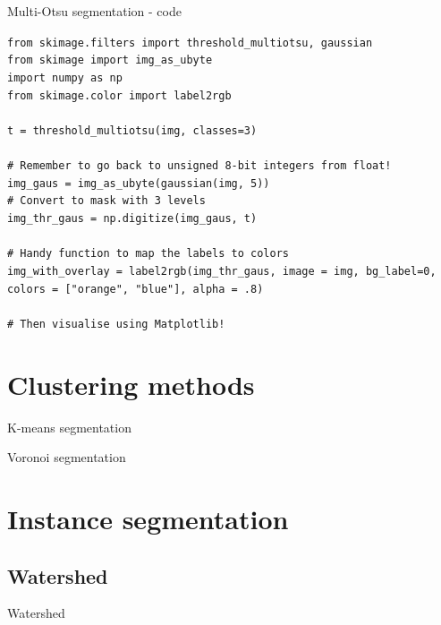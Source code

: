 \documentclass[9pt, aspectratio=169]{beamer}
\begin{document}
\begin{frame}
{Multi-Otsu segmentation - code}
\begin{codebox}
\texttt{from skimage.filters import threshold\_multiotsu, gaussian\\
from skimage import img\_as\_ubyte\\
import numpy as np\\
from skimage.color import label2rgb\\
\\
t = threshold\_multiotsu(img, classes=3)\\
\\
\# Remember to go back to unsigned 8-bit integers from float!\\
img\_gaus = img\_as\_ubyte(gaussian(img, 5))\\
\# Convert to mask with 3 levels\\
img\_thr\_gaus = np.digitize(img\_gaus, t)\\
\\
\# Handy function to map the labels to colors\\
img\_with\_overlay = label2rgb(img\_thr\_gaus, image = img, bg\_label=0, colors = ["orange", "blue"], alpha = .8)\\
\\
\# Then visualise using Matplotlib!
\\
}
\end{codebox}
\end{frame}

\section{Clustering methods}

\begin{frame}
{K-means segmentation}
\end{frame}

\begin{frame}
{Voronoi segmentation}
\end{frame}
\section{Instance segmentation}
\subsection{Watershed}

\begin{frame}
{Watershed}

\end{frame}
\end{document}
